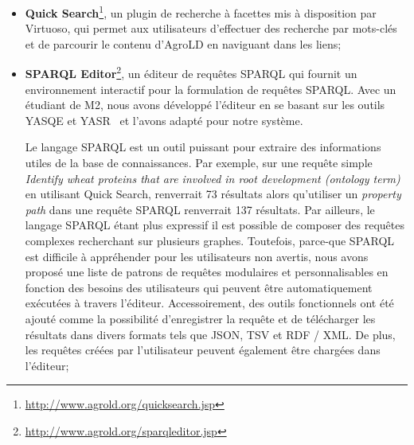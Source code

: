 \begin{itemize}
\item  \textbf{Quick Search}\footnote{\url{http://www.agrold.org/quicksearch.jsp}}, un plugin de recherche à facettes mis à disposition par Virtuoso, qui permet aux utilisateurs d'effectuer des recherche par mots-clés et de parcourir le contenu d’AgroLD en naviguant dans les liens;\\
\item \textbf{SPARQL Editor}\footnote{\url{http://www.agrold.org/sparqleditor.jsp}}, un éditeur de requêtes SPARQL qui fournit un environnement interactif pour la formulation de requêtes SPARQL. Avec un étudiant de M2, nous avons développé l'éditeur en se basant sur les outils YASQE et YASR~\cite{yasgui} et l'avons adapté pour notre système. 

Le langage SPARQL est un outil puissant pour extraire des informations utiles de la base de connaissances. Par exemple, sur une requête simple \textit{Identify wheat proteins that are involved in root development (ontology term)} en utilisant Quick Search, renverrait 73 résultats alors qu'utiliser un \textit{property path} dans une requête SPARQL renverrait 137 résultats. Par ailleurs, le langage SPARQL étant plus expressif il est possible de composer des requêtes complexes recherchant sur plusieurs graphes. Toutefois, parce-que SPARQL est difficile à appréhender pour les utilisateurs non avertis, nous avons proposé une liste de patrons de requêtes modulaires et personnalisables en fonction des besoins des utilisateurs qui peuvent être automatiquement exécutées à travers l'éditeur. Accessoirement, des outils fonctionnels ont été ajouté comme la possibilité d'enregistrer la requête et de télécharger les résultats dans divers formats tels que JSON, TSV et RDF / XML. De plus, les requêtes créées par l'utilisateur peuvent également être chargées dans l'éditeur;\\

\end{itemize}
